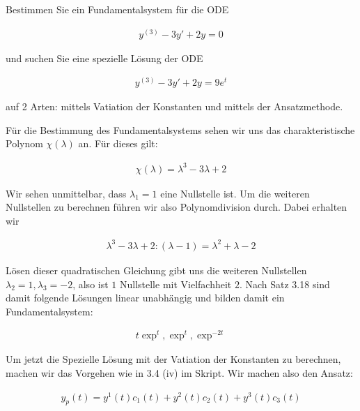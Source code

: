 \begin{exercise}
  Bestimmen Sie ein Fundamentalsystem für die ODE

  \begin{align*}
    y^{(3)} - 3y' + 2y = 0
  \end{align*}

  und suchen Sie eine spezielle Lösung der ODE

  \begin{align*}
    y^{(3)} - 3y' + 2y = 9 e^t
  \end{align*}

  auf 2 Arten:  mittels Vatiation der Konstanten und mittels der Ansatzmethode.
\end{exercise}

\begin{solution}
Für die Bestimmung des Fundamentalsystems sehen wir uns das charakteristische Polynom
$\chi(\lambda)$ an. Für dieses gilt:

\begin{align*}
  \chi(\lambda) = \lambda^3 - 3\lambda + 2
\end{align*}

Wir sehen unmittelbar, dass $\lambda_1 = 1$ eine Nullstelle ist. Um die weiteren
Nullstellen zu berechnen führen wir also Polynomdivision durch. Dabei erhalten wir

\begin{align*}
  \lambda^3 - 3\lambda + 2 : (\lambda - 1) = \lambda^2 + \lambda - 2
\end{align*}

Lösen dieser quadratischen Gleichung gibt uns die weiteren Nullstellen
$\lambda_2 = 1, \lambda_3 = -2$, also ist $1$ Nullstelle mit Vielfachheit $2$.
Nach Satz 3.18 sind damit folgende Lösungen linear unabhängig und bilden damit ein
Fundamentalsystem:

\begin{align*}
t\exp^t, \exp^t, \exp^{-2t}
\end{align*}

Um jetzt die Spezielle Lösung mit der Vatiation der Konstanten zu berechnen, machen
wir das Vorgehen wie in 3.4 (iv) im Skript. Wir machen also den Ansatz:

\begin{align*}
  y_p (t)= y^1 (t) c_1 (t) + y^2 (t) c_2 (t) + y^3 (t) c_3 (t)
\end{align*}


\end{solution}
